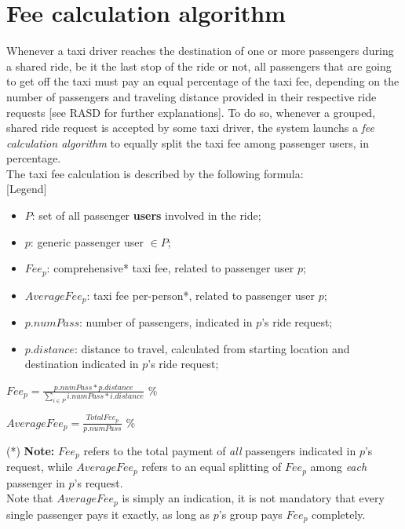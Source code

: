 \section{Fee calculation algorithm}
	Whenever a taxi driver reaches the destination of one or more passengers during a shared ride, be it the last stop of the ride or not, all passengers that are going to get off the taxi must pay an equal percentage of the taxi fee, depending on the number of passengers and traveling distance provided in their respective ride requests [see RASD for further explanations]. To do so, whenever a grouped, shared ride request is accepted by some taxi driver, the system launchs a \textit{fee calculation algorithm} to equally split the taxi fee among passenger users, in percentage.\\
	The taxi fee calculation is described by the following formula:\\
	
	[Legend]
	\begin{itemize}
		\item $P$: set of all passenger \textbf{users} involved in the ride;
		\item $p$: generic passenger user $\in P$;
		\item $Fee_p$: comprehensive* taxi fee, related to passenger user $p$;
		\item $AverageFee_p$: taxi fee per-person*, related to passenger user $p$;
		\item $p.numPass$: number of passengers, indicated in $p$'s ride request;
		\item $p.distance$: distance to travel, calculated from starting location and destination indicated in $p$'s ride request;
	\end{itemize}
	
	\begin{center}
		$Fee_p = \frac
		{p.numPass * p.distance}
		{\sum\limits_{i \in P} i.numPass * i.distance }$ \%
		
		$AverageFee_p = \frac
		{TotalFee_p}
		{p.numPass}$ \%
	\end{center}
	
	(*) \textbf{Note:} $Fee_p$ refers to the total payment of \textit{all} passengers indicated in $p$'s request, while $AverageFee_p$ refers to an equal splitting of $Fee_p$ among \textit{each} passenger in $p$'s request.\\
	Note that $AverageFee_p$ is simply an indication, it is not mandatory that every single passenger pays it exactly, as long as $p$'s group pays $Fee_p$ completely.
